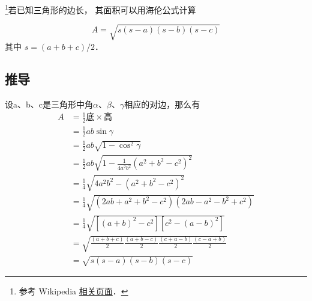 
\footnote{参考 Wikipedia \href{https://en.wikipedia.org/wiki/Heron's_formula}{相关页面}．}若已知三角形的边长， 其面积可以用海伦公式计算


\begin{equation}
A = \sqrt{s(s-a)(s-b)(s-c)}
\end{equation}
其中 $s = (a+b+c)/2$．


\subsection{推导}
设a、b、c是三角形中角$\alpha$、$\beta$、$\gamma$相应的对边，那么有
\begin{equation}
\begin{aligned}
A&=\frac{1}{2}\text{底}\times\text{高}\\
&=\frac{1}{2}ab\sin\gamma\\
&=\frac{1}{2}ab\sqrt{1-\cos^2\gamma}\\
&=\frac{1}{2}ab\sqrt{1-\frac{1}{4a^2b^2}(a^2+b^2-c^2)^2}\\
&=\frac{1}{4}\sqrt{4a^2b^2-(a^2+b^2-c^2)^2}\\
&=\frac{1}{4}\sqrt{(2ab+a^2+b^2-c^2)(2ab-a^2-b^2+c^2)}\\
&=\frac{1}{4}\sqrt{[(a+b)^2-c^2][c^2-(a-b)^2]}\\
&=\sqrt{\frac{(a+b+c)}{2}\frac{(a+b-c)}{2}\frac{(c+a-b)}{2}\frac{(c-a+b)}{2}}\\
&=\sqrt{s(s-a)(s-b)(s-c)}
\end{aligned}
\end{equation}
